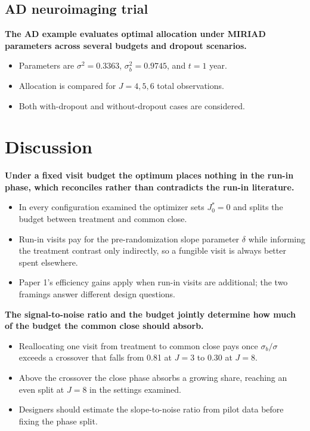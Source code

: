 \documentclass[
  11pt,
]{article}
\begin{document}
\subsection{AD neuroimaging trial}\label{ad-neuroimaging-trial}

\textbf{The AD example evaluates optimal allocation under MIRIAD parameters across several budgets and dropout scenarios.}

\begin{itemize}\setlength{\itemsep}{2pt}\setlength{\parskip}{0pt}
\item Parameters are $\sigma^2 = 0.3363$, $\sigma_b^2 = 0.9745$, and $t = 1$ year.
\item Allocation is compared for $J = 4, 5, 6$ total observations.
\item Both with-dropout and without-dropout cases are considered.
\end{itemize}

\section{Discussion}\label{discussion}

\textbf{Under a fixed visit budget the optimum places nothing in the run-in phase, which reconciles rather than contradicts the run-in literature.}

\begin{itemize}\setlength{\itemsep}{2pt}\setlength{\parskip}{0pt}
\item In every configuration examined the optimizer sets $J_0^* = 0$ and splits the budget between treatment and common close.
\item Run-in visits pay for the pre-randomization slope parameter $\delta$ while informing the treatment contrast only indirectly, so a fungible visit is always better spent elsewhere.
\item Paper 1's efficiency gains apply when run-in visits are additional; the two framings answer different design questions.
\end{itemize}

\textbf{The signal-to-noise ratio and the budget jointly determine how much of the budget the common close should absorb.}

\begin{itemize}\setlength{\itemsep}{2pt}\setlength{\parskip}{0pt}
\item Reallocating one visit from treatment to common close pays once $\sigma_b/\sigma$ exceeds a crossover that falls from 0.81 at $J = 3$ to 0.30 at $J = 8$.
\item Above the crossover the close phase absorbs a growing share, reaching an even split at $J = 8$ in the settings examined.
\item Designers should estimate the slope-to-noise ratio from pilot data before fixing the phase split.
\end{itemize}
\end{document}
